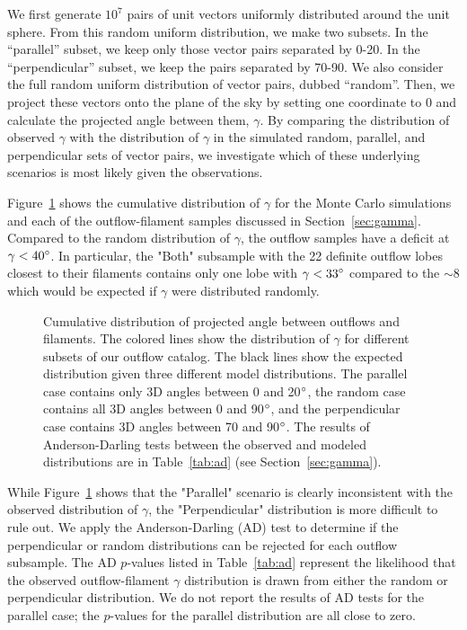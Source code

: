 \documentclass[twocolumn]{aastex63}
\begin{document}
We first generate $10^7$ pairs of unit vectors uniformly distributed around the unit sphere. From this random uniform distribution, we make two subsets. In the ``parallel'' subset, we keep only those vector pairs separated by 0-20\degr. In the ``perpendicular'' subset, we keep the pairs separated by 70-90\degr. We also consider the full random uniform distribution of vector pairs, dubbed ``random''. Then, we project these vectors onto the plane of the sky by setting one coordinate to 0 and calculate the projected angle between them, $\gamma$. By comparing the distribution of observed $\gamma$ with the distribution of $\gamma$ in the simulated random, parallel, and perpendicular sets of vector pairs, we investigate which of these underlying scenarios is most likely given the observations.

Figure~\ref{fig:gamma_cdf} shows the cumulative distribution of $\gamma$ for the Monte Carlo simulations and each of the outflow-filament samples discussed in Section~\ref{sec:gamma}. Compared to the random distribution of $\gamma$, the outflow samples have a deficit at $\gamma < 40\mbox{$^\circ$}$. In particular, the "Both" subsample with the 22 definite outflow lobes closest to their filaments contains only one lobe with $\gamma < 33\mbox{$^\circ$}$ compared to the $\sim8$ which would be expected if $\gamma$ were distributed randomly.

\begin{figure}
\caption{Cumulative distribution of projected angle between outflows and filaments. The colored lines show the distribution of $\gamma$ for different subsets of our outflow catalog. The black lines show the expected distribution given three different model distributions. The parallel case contains only 3D angles between 0 and 20$\mbox{$^\circ$}$, the random case contains all 3D angles between 0 and 90$\mbox{$^\circ$}$, and the perpendicular case contains 3D angles between 70 and 90$\mbox{$^\circ$}$. The results of Anderson-Darling tests between the observed and modeled distributions are in Table~\ref{tab:ad} (see Section~\ref{sec:gamma}).\label{fig:gamma_cdf}}
\end{figure}


While Figure~\ref{fig:gamma_cdf} shows that the "Parallel" scenario is clearly inconsistent with the observed distribution of $\gamma$, the "Perpendicular" distribution is more difficult to rule out. We apply the Anderson-Darling (AD) test \citep{Stephens74} to determine if the perpendicular or random distributions can be rejected for each outflow subsample. The AD $p$-values listed in Table~\ref{tab:ad} represent the likelihood that the observed outflow-filament $\gamma$ distribution is drawn from either the random or perpendicular distribution. We do not report the results of AD tests for the parallel case; the $p$-values for the parallel distribution are all close to zero.
\end{document}

